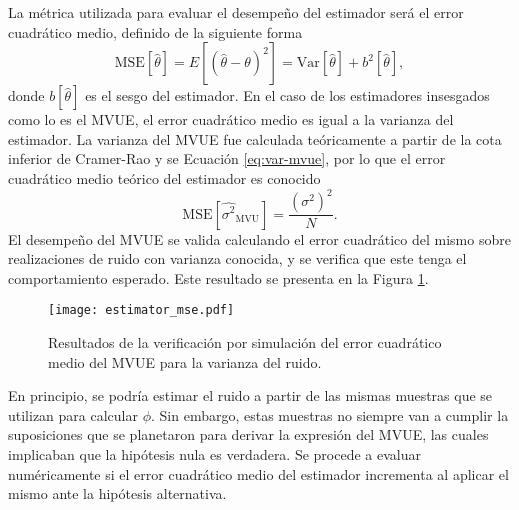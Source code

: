 La métrica utilizada para evaluar el desempeño del estimador será el error cuadrático medio, definido de la siguiente forma
\begin{equation}\label{eq:mse-def}
    \text{MSE}[\widehat{\theta}] = E\left[(\widehat{\theta}-\theta)^2\right] = \text{Var}[\widehat{\theta}] + b^2[\widehat{\theta}],
\end{equation}
donde $b[\widehat{\theta}]$ es el sesgo del estimador. En el caso de los estimadores insesgados como lo es el MVUE, el error cuadrático medio es igual a la varianza del estimador. La varianza del MVUE fue calculada teóricamente a partir de la cota inferior de Cramer-Rao y se Ecuación \ref{eq:var-mvue}, por lo que el error cuadrático medio teórico del estimador es conocido
\begin{equation}\label{eq:mvue-mse}
    \text{MSE}[\widehat{\sigma^2}_{\text{MVU}}] = \frac{\left(\sigma^2\right)^2}{N}.
\end{equation}
El desempeño del MVUE se valida calculando el error cuadrático del mismo sobre realizaciones de ruido con varianza conocida, y se verifica que este tenga el comportamiento esperado. Este resultado se presenta en la Figura \ref{fig:estimator_mse}.
\begin{figure}[t]
    \centering{}\texttt{[image: estimator\_mse.pdf]}
    \caption[Error cuadrático medio del MVUE para la varianza del ruido.]{Resultados de la verificación por simulación del error cuadrático medio del MVUE para la varianza del ruido.\label{fig:estimator_mse}}
\end{figure}

En principio, se podría estimar el ruido a partir de las mismas muestras que se utilizan para calcular $\phi$. Sin embargo, estas muestras no siempre van a cumplir la suposiciones que se planetaron para derivar la expresión del MVUE, las cuales implicaban que la hipótesis nula es verdadera. Se procede a evaluar numéricamente si el error cuadrático medio del estimador incrementa al aplicar el mismo ante la hipótesis alternativa. 


